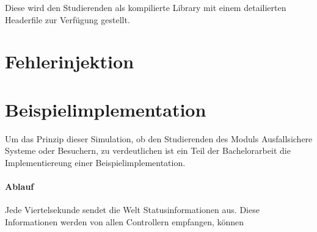 \documentclass[
    12pt,
    bibliography=totoc,
    ngerman
]{scrartcl}
\begin{document}
Diese wird den Studierenden als kompilierte Library mit einem detailierten Headerfile zur Verf{\"{u}}gung gestellt.

\clearpage
\section{Fehlerinjektion}

\clearpage
\section{Beispielimplementation}
Um das Prinzip dieser Simulation, ob den Studierenden des Moduls Ausfallsichere Systeme oder Besuchern, zu verdeutlichen ist ein Teil der Bachelorarbeit die Implementiereung einer
Beispielimplementation.

\paragraph{Ablauf} Jede Viertelsekunde sendet die Welt Statusinformationen aus.  Diese Informationen werden von allen Controllern empfangen, k{\"{o}}nnen
\end{document}
